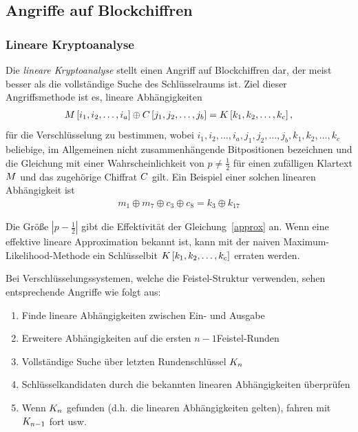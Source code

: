 \subsection{Angriffe auf Blockchiffren}
\subsubsection{Lineare Kryptoanalyse}\label{sssec:linKryptoanalyse}
Die \textit{lineare Kryptoanalyse} stellt einen Angriff auf Blockchiffren dar, der meist besser als die vollständige Suche des Schlüsselraums ist. Ziel dieser Angriffsmethode ist es, lineare Abhängigkeiten
\begin{align}
	M \left[ i_1, i_2, \ldots, i_a \right] \oplus C \left[ j_1, j_2, \ldots, j_b \right]  = K \left[ k_1, k_2, \ldots, k_c \right], \label{approx}
\end{align}
für die Verschlüsselung zu bestimmen, wobei  $i_1, i_2, \ldots, i_a, j_1, j_2, \ldots, j_b,k_1, k_2, \ldots, k_c$ beliebige, im Allgemeinen nicht zusammenhängende Bitpositionen
bezeichnen und die Gleichung mit einer Wahrscheinlichkeit von $p \neq \frac{1}{2}$ für einen zufälligen Klartext $M$ und das zugehörige Chiffrat $C$ gilt. 
Ein Beispiel einer solchen linearen Abhängigkeit ist
\begin{align*}
	m_1 \oplus m_7 \oplus c_3 \oplus c_8 = k_3 \oplus k_{17}
\end{align*}

Die Größe $\left|{p-\frac{1}{2}}\right|$ gibt die Effektivität der Gleichung~\ref{approx} an. Wenn eine effektive lineare Approximation bekannt ist, kann mit der naiven Maximum-Likelihood-Methode ein
Schlüsselbit $K \left[ k_1, k_2, \ldots, k_c \right]$ erraten werden.

Bei Verschlüsselungssystemen, welche die Feistel-Struktur verwenden, sehen entsprechende Angriffe wie folgt aus:
\begin{enumerate}
	\item Finde lineare Abhängigkeiten zwischen Ein- und Ausgabe
	\item Erweitere Abhängigkeiten auf die ersten $n - 1$Feistel-Runden
	\item Vollständige Suche über letzten Rundenschlüssel $K_n$
	\item Schlüsselkandidaten durch die bekannten linearen Abhängigkeiten überprüfen
	\item Wenn $K_n$ gefunden (d.h. die linearen Abhängigkeiten gelten), fahren mit $K_{n-1}$ fort usw.
\end{enumerate}

